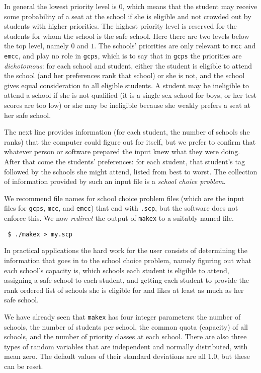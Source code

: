 \documentclass[12pt]{article}
\theoremstyle{definition}
\begin{document}
In general the lowest priority level is 0, which means that the
student may receive some probability of a seat at the school if she is
eligible and not crowded out by students with higher priorities.  The
highest priority level is reserved for the students for whom the
school is the safe school.  Here there are two levels below the top
level, namely $0$ and $1$.  The schools' priorities are only relevant
to \texttt{mcc} and \texttt{emcc}, and play no role in \texttt{gcps},
which is to say that in \texttt{gcps} the priorities are
\emph{dichotomous}: for each school and student, either the student is
eligible to attend the school (and her preferences rank that school)
or she is not, and the school gives equal consideration to all
eligible students.  A student may be ineligible to attend a school if
she is not qualified (it is a single sex school for boys, or her test
scores are too low) or she may be ineligible because she weakly
prefers a seat at her safe school.

The next line provides information (for each student, the number of
schools she ranks) that the computer could figure out for itself, but
we prefer to confirm that whatever person or software prepared the
input knew what they were doing.  After that come the students'
preferences: for each student, that student's tag followed by the
schools she might attend, listed from best to worst.  The collection
of information provided by such an input file is a \emph{school choice
problem}.

We recommend file names for school choice problem files (which are the
input files for \texttt{gcps}, \texttt{mcc}, and \texttt{emcc}) that
end with \texttt{.scp}, but the software does not enforce this.  We
now \emph{redirect} the output of \texttt{makex} to a suitably named
file.

\begin{obeylines}\texttt{
    \$ ./makex > my.scp
  }
\end{obeylines}

\bigskip \noindent
In practical applications the hard work for the user consists of
determining the information that goes in to the school choice problem,
namely figuring out what each school's capacity is, which schools each
student is eligible to attend, assigning a safe school to each
student, and getting each student to provide the rank ordered list of
schools she is eligible for and likes at least as much as her safe
school.

We have already seen that \texttt{makex} has four integer parameters:
the number of schools, the number of students per school, the common
quota (capacity) of all schools, and the number of priority classes at
each school.  There are also three types of random variables that are
independent and normally distributed, with mean zero.  The default
values of their standard deviations are all 1.0, but these can be
reset.
\end{document}
